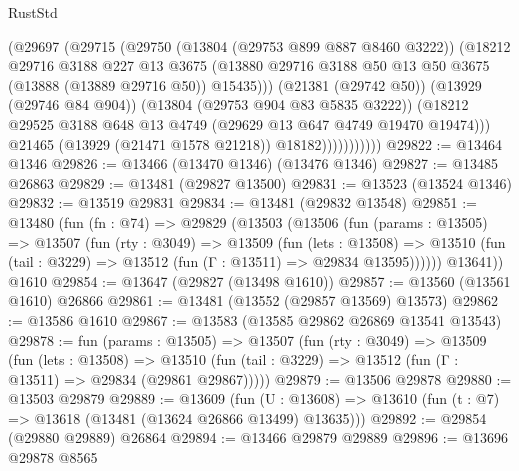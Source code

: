 \begin{lexlean}{RustStd}
\begin{coremodule}
                        (@29697
                          (@29715
                            (@29750
                              (@13804 (@29753 @899 @887 @8460 @3222))
                              (@18212
                                @29716
                                @3188
                                @227
                                @13
                                @3675
                                (@13880
                                  @29716
                                  @3188
                                  @50
                                  @13
                                  @50
                                  @3675
                                  (@13888 (@13889 @29716 @50))
                                  @15435)))
                            (@21381 (@29742 @50))
                            (@13929 (@29746 @84 @904))
                            (@13804 (@29753 @904 @83 @5835 @3222))
                            (@18212
                              @29525
                              @3188
                              @648
                              @13
                              @4749
                              (@29629 @13 @647 @4749 @19470 @19474)))
                          @21465
                          (@13929 (@21471 @1578 @21218))
                          @18182)))))))))))
@29822 := @13464 @1346
@29826 := @13466 (@13470 @1346) (@13476 @1346)
@29827 := @13485 @26863
@29829 := @13481 (@29827 @13500)
@29831 := @13523 (@13524 @1346)
@29832 := @13519 @29831
@29834 := @13481 (@29832 @13548)
@29851 := @13480
    (fun (fn : @74) =>
    @29829
      (@13503
        (@13506
          (fun (params : @13505) =>
          @13507
            (fun (rty : @3049) =>
            @13509
              (fun (lets : @13508) =>
              @13510 (fun (tail : @3229) => @13512 (fun (Γ : @13511) => @29834 @13595))))))
        @13641))
    @1610
@29854 := @13647 (@29827 (@13498 @1610))
@29857 := @13560 (@13561 @1610) @26866
@29861 := @13481 (@13552 (@29857 @13569) @13573)
@29862 := @13586 @1610
@29867 := @13583 (@13585 @29862 @26869 @13541 @13543)
@29878 := fun (params : @13505) =>
  @13507
    (fun (rty : @3049) =>
    @13509
      (fun (lets : @13508) =>
      @13510 (fun (tail : @3229) => @13512 (fun (Γ : @13511) => @29834 (@29861 @29867)))))
@29879 := @13506 @29878
@29880 := @13503 @29879
@29889 := @13609
    (fun (U : @13608) => @13610 (fun (t : @7) => @13618 (@13481 (@13624 @26866 @13499) @13635)))
@29892 := @29854 (@29880 @29889) @26864
@29894 := @13466 @29879 @29889
@29896 := @13696 @29878 @8565

\end{coremodule}
\end{lexlean}
